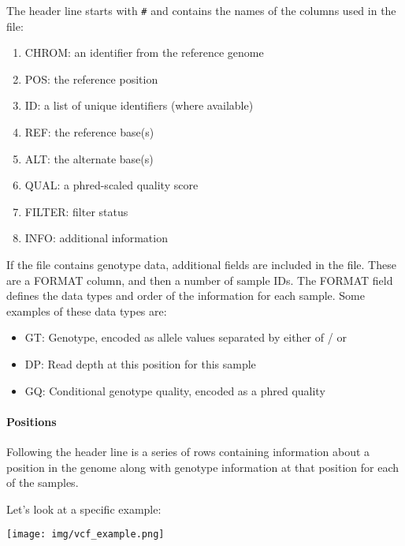 \documentclass[11pt]{article}
\providecommand{\tightlist}{%
      \setlength{\itemsep}{0pt}\setlength{\parskip}{0pt}}
\begin{document}
The header line starts with \texttt{\#} and contains the names of the
columns used in the file:

\begin{enumerate}
\def\labelenumi{\arabic{enumi}.}
\tightlist
\item
  CHROM: an identifier from the reference genome
\item
  POS: the reference position
\item
  ID: a list of unique identifiers (where available)
\item
  REF: the reference base(s)
\item
  ALT: the alternate base(s)
\item
  QUAL: a phred-scaled quality score
\item
  FILTER: filter status
\item
  INFO: additional information
\end{enumerate}

If the file contains genotype data, additional fields are included in
the file. These are a FORMAT column, and then a number of sample IDs.
The FORMAT field defines the data types and order of the information for
each sample. Some examples of these data types are:

\begin{itemize}
\tightlist
\item
  GT: Genotype, encoded as allele values separated by either of / or
  \textbar{}
\item
  DP: Read depth at this position for this sample
\item
  GQ: Conditional genotype quality, encoded as a phred quality
\end{itemize}

\hypertarget{positions}{%
\paragraph{Positions}\label{positions}}

Following the header line is a series of rows containing information
about a position in the genome along with genotype information at that
position for each of the samples.

Let's look at a specific example:


\begin{center}
\texttt{[image: img/vcf\_example.png]}
\end{center}
\end{document}
